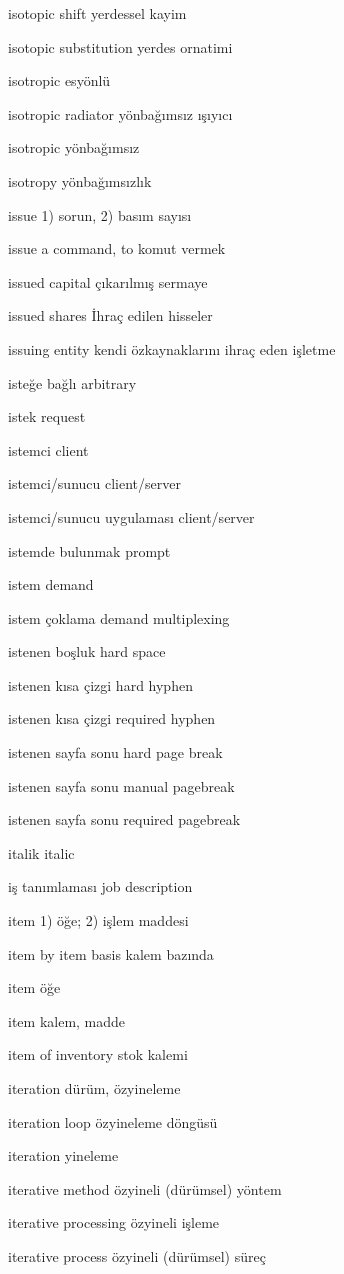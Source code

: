 \documentclass[12pt,fleqn]{article}\usepackage{../../common}
\begin{document}
isotopic shift yerdessel kayim

isotopic substitution yerdes ornatimi

isotropic esyönlü

isotropic radiator yönbağımsız ışıyıcı

isotropic yönbağımsız

isotropy yönbağımsızlık

issue 1) sorun, 2) basım sayısı

issue a command, to komut vermek

issued capital çıkarılmış sermaye

issued shares İhraç edilen hisseler

issuing entity kendi özkaynaklarını ihraç eden işletme

isteğe bağlı arbitrary

istek request

istemci client

istemci/sunucu client/server

istemci/sunucu uygulaması client/server

istemde bulunmak prompt

istem demand

istem çoklama demand multiplexing

istenen boşluk hard space

istenen kısa çizgi hard hyphen

istenen kısa çizgi required hyphen

istenen sayfa sonu hard page break

istenen sayfa sonu manual pagebreak

istenen sayfa sonu required pagebreak

italik italic

iş tanımlaması job description

item 1) öğe; 2) işlem maddesi

item by item basis kalem bazında

item öğe

item kalem, madde

item of inventory stok kalemi

iteration dürüm, özyineleme

iteration loop özyineleme döngüsü

iteration yineleme

iterative method özyineli (dürümsel) yöntem

iterative processing özyineli işleme

iterative process özyineli (dürümsel) süreç
\end{document}
